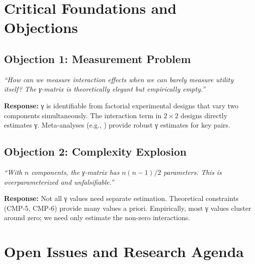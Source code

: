 \section{Critical Foundations and Objections}
\label{sec:how-critical}

\subsection{Objection 1: Measurement Problem}

\begin{tcolorbox}[colback=red!5!white, colframe=red!50!black,
    title=Objection: γ Cannot Be Measured]
\textit{``How can we measure interaction effects when we can barely measure utility itself?
The γ-matrix is theoretically elegant but empirically empty.''}
\end{tcolorbox}

\textbf{Response:}
γ is identifiable from factorial experimental designs that vary two components
simultaneously. The interaction term in $2 \times 2$ designs directly estimates γ.
Meta-analyses (e.g., \citet{deci1999meta}) provide robust γ estimates for key pairs.

\subsection{Objection 2: Complexity Explosion}

\begin{tcolorbox}[colback=red!5!white, colframe=red!50!black,
    title=Objection: Too Many Parameters]
\textit{``With $n$ components, the γ-matrix has $n(n-1)/2$ parameters.
This is overparameterized and unfalsifiable.''}
\end{tcolorbox}

\textbf{Response:}
Not all γ values need separate estimation. Theoretical constraints (CMP-5, CMP-6)
provide many values a priori. Empirically, most γ values cluster around zero;
we need only estimate the non-zero interactions.


\section{Open Issues and Research Agenda}
\label{sec:how-open}

